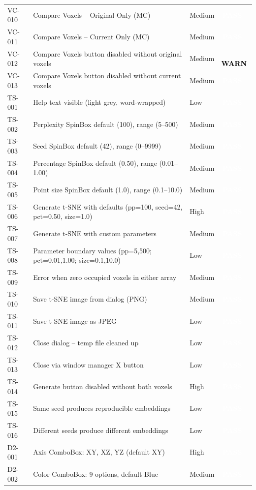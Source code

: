 \documentclass[12pt,a4paper]{article}
\newcommand{\statuspass}{\colorbox{statusgreen}{\textcolor{white}{\textbf{\,PASS\,}}}}
\newcommand{\statuswarn}{\colorbox{statusyellow}{\textcolor{black}{\textbf{\,WARN\,}}}}
\begin{document}
{\begin{longtable}{p{1.7cm}p{7.7cm}p{1.3cm}p{2cm}}
VC-010 & Compare Voxels -- Original Only (MC) & Medium & \statuspass \\
VC-011 & Compare Voxels -- Current Only (MC) & Medium & \statuspass \\
VC-012 & Compare Voxels button disabled without original voxels & Medium & \statuswarn \\
VC-013 & Compare Voxels button disabled without current voxels & Medium & \statuspass \\
TS-001 & Help text visible (light grey, word-wrapped) & Low & \statuspass \\
TS-002 & Perplexity SpinBox default (100), range (5--500) & Medium & \statuspass \\
TS-003 & Seed SpinBox default (42), range (0--9999) & Medium & \statuspass \\
TS-004 & Percentage SpinBox default (0.50), range (0.01--1.00) & Medium & \statuspass \\
TS-005 & Point size SpinBox default (1.0), range (0.1--10.0) & Medium & \statuspass \\
TS-006 & Generate t-SNE with defaults (pp=100, seed=42, pct=0.50, size=1.0) & High & \statuspass \\
TS-007 & Generate t-SNE with custom parameters & Medium & \statuspass \\
TS-008 & Parameter boundary values (pp=5,500; pct=0.01,1.00; size=0.1,10.0) & Low & \statuspass \\
TS-009 & Error when zero occupied voxels in either array & Medium & \statuspass \\
TS-010 & Save t-SNE image from dialog (PNG) & Medium & \statuspass \\
TS-011 & Save t-SNE image as JPEG & Low & \statuspass \\
TS-012 & Close dialog -- temp file cleaned up & Low & \statuspass \\
TS-013 & Close via window manager X button & Low & \statuspass \\
TS-014 & Generate button disabled without both voxels & High & \statuspass \\
TS-015 & Same seed produces reproducible embeddings & Low & \statuspass \\
TS-016 & Different seeds produce different embeddings & Low & \statuspass \\
D2-001 & Axis ComboBox: XY, XZ, YZ (default XY) & High & \statuspass \\
D2-002 & Color ComboBox: 9 options, default Blue & Medium & \statuspass \\

\end{longtable}}
\end{document}
